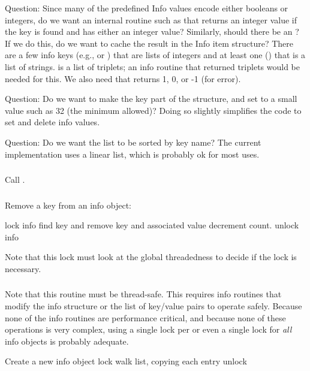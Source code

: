 \documentclass{article}
\begin{document}
Question: Since many of the predefined Info values encode either booleans or
integers, do we want an internal routine such as 
that returns an integer value if the key is found and has either an integer
value?  Similarly, should there be an ?
If we do this, do we want to cache the result in the Info item
structure?
There are a few info keys (e.g.,  or
) that are lists of integers and at least one
() that is a list of strings.  
is a list of triplets; an info routine that returned triplets would be
needed for this.
We also need  that returns 1, 0, or -1
(for error).  

Question: Do we want to make the key part of the structure, and set
 to a small value such as 32 (the minimum
allowed)?  Doing so slightly simplifies the code to set and delete info
values. 

Question: Do we want the list to be sorted by key name?  The current
implementation uses a linear list, which is probably ok for most uses.

\subsubsection{}
Call .

\subsubsection{}
Remove a key from an info object:
\begin{algorithm}
lock info
find key and remove key and associated value
decrement count.
unlock info
\end{algorithm}
Note that this lock must look at the global threadedness to decide if
the lock is necessary.  

\subsubsection{}
Note that this routine must be thread-safe.  This requires info routines that
modify the info structure or the list of key/value pairs to operate safely.
Because none of the info routines are performance critical, and because none
of these operations is very complex, using a single lock per 
or even a single lock for \emph{all} info objects is probably adequate.
\begin{algorithm}
Create a new info object
lock
walk list, copying each entry
unlock
\end{algorithm}
\end{document}

